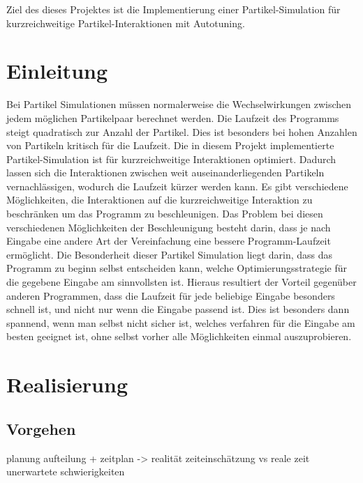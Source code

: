 \documentclass[
	12pt,
	a4paper,
	BCOR10mm,
	DIV14,
	headsepline,
]{scrreprt}
\begin{document}
\thispagestyle{empty}

Ziel des dieses Projektes ist die Implementierung einer Partikel-Simulation für kurzreichweitige Partikel-Interaktionen mit Autotuning.

\tableofcontents

\chapter{Einleitung}
\label{Einleitung}

Bei Partikel Simulationen müssen normalerweise die Wechselwirkungen zwischen jedem möglichen Partikelpaar berechnet werden. Die Laufzeit des Programms steigt quadratisch zur Anzahl der Partikel. Dies ist besonders bei hohen Anzahlen von Partikeln kritisch für die Laufzeit. Die in diesem Projekt implementierte Partikel-Simulation ist für kurzreichweitige Interaktionen optimiert. Dadurch lassen sich die Interaktionen zwischen weit auseinanderliegenden Partikeln vernachlässigen, wodurch die Laufzeit kürzer werden kann. Es gibt verschiedene Möglichkeiten, die Interaktionen auf die kurzreichweitige Interaktion zu beschränken um das Programm zu beschleunigen. Das Problem bei diesen verschiedenen Möglichkeiten der Beschleunigung besteht darin, dass je nach Eingabe eine andere Art der Vereinfachung eine bessere Programm-Laufzeit ermöglicht. Die Besonderheit dieser Partikel Simulation liegt darin, dass das Programm zu beginn selbst entscheiden kann, welche Optimierungsstrategie für die gegebene Eingabe am sinnvollsten ist. Hieraus resultiert der Vorteil gegenüber anderen Programmen, dass die Laufzeit für jede beliebige Eingabe besonders schnell ist, und nicht nur wenn die Eingabe passend ist. Dies ist besonders dann spannend, wenn man selbst nicht sicher ist, welches verfahren für die Eingabe am besten geeignet ist, ohne selbst vorher alle Möglichkeiten einmal auszuprobieren.

\chapter{Realisierung}
\label{Realisierung}

\section{Vorgehen}

planung
aufteilung + zeitplan -> realität
zeiteinschätzung vs reale zeit
unerwartete schwierigkeiten
\end{document}
